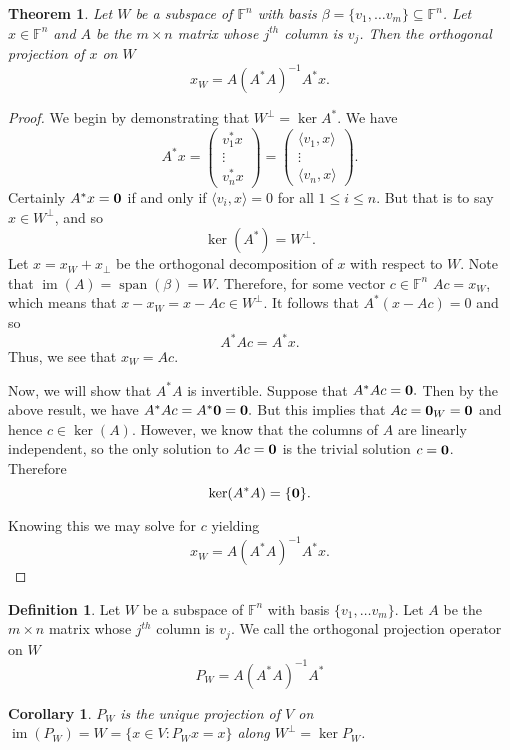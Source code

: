 \documentclass[oneside, 12pt]{book}
\DeclareMathOperator{\spn}{span}
\DeclareMathOperator{\im}{im}
\newtheorem{thm}{Theorem}[section]
\newtheorem{cor}{Corollary}[section]
\theoremstyle{definition}
\newtheorem{defn}{Definition}[section]
\begin{document}
\begin{thm}
Let $W$ be a subspace of $\mathbb{F}^{n}$ with basis $\beta=\{v_{1}, \dots v_{m}\} \subseteq \mathbb{F}^{n}$. Let $x \in \mathbb{F}^{n}$ and $A$ be the $m \times n$ matrix  whose $j^{th}$ column is $v_{j}$. Then the orthogonal projection of $x$ on $W$ \[x_{W}=A(A^{*}A)^{-1}A^{*}x.\]
\end{thm}

\begin{proof}
  We begin by demonstrating that $W^{\perp}=\ker A^{*}$. We have
  \[A^{*}x= \begin{pmatrix}v_{1}^{*}x \\ \vdots \\ v_{n}^{*}x \end{pmatrix}=\begin{pmatrix}\langle v_{1}, x \rangle \\  \vdots \\ \langle v_{n}, x \rangle\end{pmatrix}.\] Certainly
  $A^{*}x=\bold{0}$ if and only if $\langle v_{i}, x \rangle=0$ for all $1 \leq i \leq n$. But that is to say $x \in W^{\perp}$, and so \[\ker(A^{*})=W^{\perp}.\]
  Let $x=x_{W}+x_{\perp}$ be the orthogonal decomposition of $x$ with respect to $W$.
  Note that $\im(A)=\spn(\beta)=W$. Therefore, for some vector $c \in \mathbb{F}^{n}$ $Ac=x_{W}$, which means that $x-x_{W}=x-Ac \in W^{\perp}$. It follows that
  $A^{*}(x-Ac)=0$ and so \[A^{*}Ac=A^{*}x.\] Thus, we see that $x_{W}=Ac$.

  Now, we will show that $A^{*}A$ is invertible. Suppose that $A^{*}Ac=\bold{0}.$ Then by the above result, we have $A^{*}Ac=A^{*}\bold{0}=\bold{0}.$ But this implies that $Ac=\bold{0}_{W}=\bold{0}$ and hence $c \in \ker(A)$. However, we know that the columns of $A$ are linearly independent, so the only solution to $Ac=\bold{0}$ is the trivial solution $c=\bold{0}$. Therefore \[\ker(A^{*}A)=\{\bold{0}\}.\]

  Knowing this we may solve for $c$ yielding \[x_{W}=A(A^{*}A)^{-1}A^{*}x.\]
\end{proof}
\begin{defn}
  \label{ortho_proj}
  Let $W$ be a subspace of $\mathbb{F}^{n}$ with basis $\{v_{1}, \dots v_{m}\}$. Let $A$ be the $m \times n$ matrix whose $j^{th}$ column is $v_{j}$. We call the orthogonal projection operator on $W$
  \[P_{W}=A(A^{*}A)^{-1}A^{*}\]
\end{defn}
\begin{cor}
  \label{cor_orthproj}
$P_{W}$ is the unique projection of $V$ on $\im(P_{W})=W=\{x \in V: P_{W}x=x\}$ along $W^{\perp}=\ker{P_{W}}$.
\end{cor}
\end{document}
